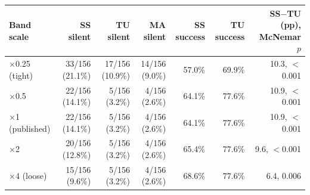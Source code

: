 \begin{tabular}{lrrrrrr}
\toprule
Band scale & SS silent & TU silent & MA silent & SS success & TU success & SS$-$TU (pp), McNemar $p$ \\
\midrule
$\times$0.25 (tight) & 33/156 (21.1\%) & 17/156 (10.9\%) & 14/156 (9.0\%) & 57.0\% & 69.9\% & 10.3, $<$0.001 \\
$\times$0.5 & 22/156 (14.1\%) & 5/156 (3.2\%) & 4/156 (2.6\%) & 64.1\% & 77.6\% & 10.9, $<$0.001 \\
$\times$1 (published) & 22/156 (14.1\%) & 5/156 (3.2\%) & 4/156 (2.6\%) & 64.1\% & 77.6\% & 10.9, $<$0.001 \\
$\times$2 & 20/156 (12.8\%) & 5/156 (3.2\%) & 4/156 (2.6\%) & 65.4\% & 77.6\% & 9.6, $<$0.001 \\
$\times$4 (loose) & 15/156 (9.6\%) & 5/156 (3.2\%) & 4/156 (2.6\%) & 68.6\% & 77.6\% & 6.4, 0.006 \\
\bottomrule
\end{tabular}
